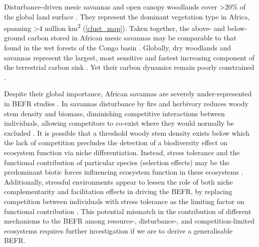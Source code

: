 \documentclass[12pt,a4paper]{article}
\begin{document}
Disturbance-driven mesic savannas and open canopy woodlands cover >20\% of the global land surface \citep{Pennington2018, Solbrig1996}. They represent the dominant vegetation type in Africa, spanning >4 million km\textsuperscript{2} \citep{White1987, Ratnam2011, Ryan2016} (\autoref{clust_map}). Taken together, the above- and below-ground carbon stored in African mesic savannas may be comparable to that found in the wet forests of the Congo basin \citep{Houghton2009, Mayaux2008, Spawn2020}. Globally, dry woodlands and savannas represent the largest, most sensitive and fastest increasing component of the terrestrial carbon sink \citep{Ahlstrom2015}. Yet their carbon dynamics remain poorly constrained \citep{Sitch2015}.

Despite their global importance, African savannas are severely under-represented in BEFR studies \citep{Clarke2017, Liang2016}. In savannas disturbance by fire \citep{Lehmann2014} and herbivory \citep{Sankaran2008, Levick2009} reduces woody stem density and biomass, diminishing competitive interactions between individuals, allowing competitors to co-exist where they would normally be excluded \citep{Grime1979, Grace1990}. It is possible that a threshold woody stem density exists below which the lack of competition precludes the detection of a biodiversity effect on ecosystem function via niche differentiation. Instead, stress tolerance and the functional contribution of particular species (selection effects) may be the predominant biotic forces influencing ecosystem function in these ecosystems \citep{Lasky2014, Tobner2016}. Additionally, stressful environments appear to lessen the role of both niche complementarity and facilitation effects in driving the BEFR, by replacing competition between individuals with stress tolerance as the limiting factor on functional contribution \citep{Ratcliffe2017, Paquette2010}. This potential mismatch in the contribution of different mechanisms to the BEFR among resource-, disturbance-, and competition-limited ecosystems requires further investigation if we are to derive a generalisable BEFR.
\end{document}
